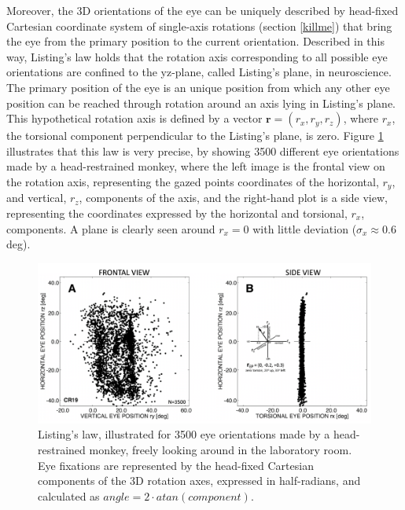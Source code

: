 Moreover, the 3D orientations of the eye can be uniquely described by head-fixed Cartesian coordinate system of single-axis rotations (section \ref{killme}) that bring the eye from the primary position to the current orientation. Described in this way, Listing's law holds that the rotation axis corresponding to all possible eye orientations are confined to the yz-plane, called Listing's plane, in neuroscience. The primary position of the eye is an unique position 
from which any other eye position can be reached through rotation around an axis lying in Listing's plane. This hypothetical rotation axis is defined by a vector 
$ \mathbf{r}  = \left( r _ { x } , r _ { y } , r _ { z } \right)$, where $r _ { x }$, the torsional component perpendicular to the Listing's plane, is zero. 
Figure \ref{sec2:fig:monkey} illustrates that this law is very precise, by showing 3500 different eye orientations made by a head-restrained monkey, where the left image is the frontal view on the rotation axis, representing the gazed points coordinates of the horizontal, $r_{ y }$, and vertical, $r_{ z }$, components of the axis, and the right-hand plot is a side view, representing the coordinates expressed by the  horizontal and torsional, $r_x$, components. A plane is clearly seen around $r_x = 0$ with little deviation ($\sigma _x \approx 0.6$ deg).
\begin{figure}[ht]
	\centering
	\includegraphics[width=13cm]{images/ll.png}
	\caption[Listing’s law, illustrated for 3500 eye orientations made by a head-restrained monkey]{Listing’s law, illustrated for 3500 eye orientations made by a head-restrained monkey, freely looking around in the laboratory room. Eye fixations are represented by the head-fixed Cartesian components of the 3D rotation axes, expressed in half-radians, and calculated as $angle = 2 \cdot atan(component)$. \cite{donders}}
	\label{sec2:fig:monkey}
\end{figure}

